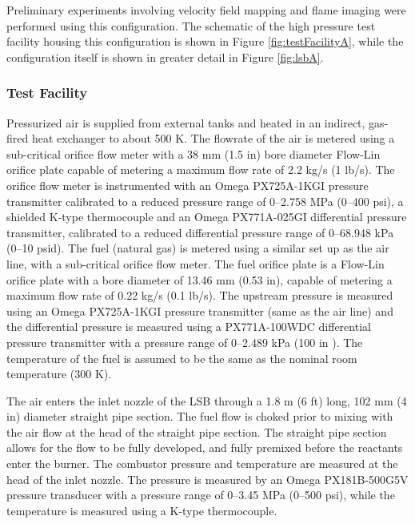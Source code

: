 Preliminary experiments involving velocity field mapping and flame imaging were performed using this configuration.
The schematic of the high pressure test facility housing this configuration is shown in Figure \ref{fig:testFacilityA}, while the configuration itself is shown in greater detail in Figure \ref{fig:lsbA}.

\subsubsection{Test Facility}
\label{subsubsec:configuration-a-test-facility}



Pressurized air is supplied from external tanks and heated in an indirect, gas-fired heat exchanger to about 500 K.
The flowrate of the air is metered using a sub-critical orifice flow meter with a 38 mm (1.5 in) bore diameter Flow-Lin orifice plate capable of metering a maximum flow rate of 2.2 kg/s (1 lb/s).
The orifice flow meter is instrumented with an Omega PX725A-1KGI pressure transmitter calibrated to a reduced pressure range of 0--2.758 MPa (0--400 psi), a shielded K-type thermocouple and an Omega PX771A-025GI differential pressure transmitter, calibrated to a reduced differential pressure range of 0--68.948 kPa (0--10 psid).
The fuel (natural gas) is metered using a similar set up as the air line, with a sub-critical orifice flow meter.
The fuel orifice plate is a Flow-Lin orifice plate with a bore diameter of 13.46 mm (0.53 in), capable of metering a maximum flow rate of 0.22 kg/s (0.1 lb/s).
The upstream pressure is measured using an Omega PX725A-1KGI pressure transmitter (same as the air line) and the differential pressure is measured using a PX771A-100WDC differential pressure transmitter with a pressure range of 0--2.489 kPa (100 in ).
The temperature of the fuel is assumed to be the same as the nominal room temperature (300 K).

The air enters the inlet nozzle of the LSB through a 1.8 m (6 ft) long, 102 mm (4 in) diameter straight pipe section.
The fuel flow is choked prior to mixing with the air flow at the head of the straight pipe section.
The straight pipe section allows for the flow to be fully developed, and fully premixed before the reactants enter the burner.
The combustor pressure and temperature are measured at the head of the inlet nozzle.
The pressure is measured by an Omega PX181B-500G5V pressure transducer with a pressure range of 0--3.45 MPa (0--500 psi), while the temperature is measured using a K-type thermocouple.

